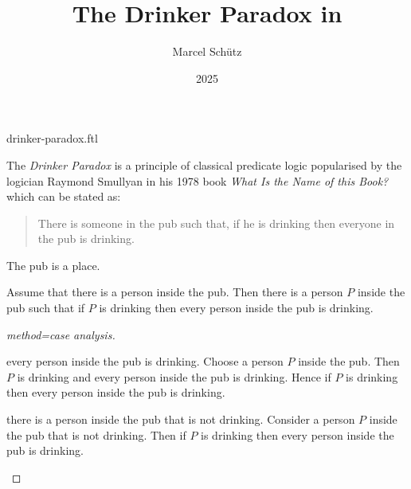 \documentclass{stex}
\title{The Drinker Paradox in \Naproche}
\author{Marcel Schütz}
\date{2025}
\begin{document}
\begin{smodule}{drinker-paradox.ftl}
\maketitle


\noindent The \emph{Drinker Paradox} is a principle of classical predicate 
logic popularised by the logician Raymond Smullyan in his 1978 book
\textit{What Is the Name of this Book?} \cite{Smullyan1978} which can be 
stated as:

\begin{quotation}
  \noindent There is someone in the pub such that, if he is drinking then 
  everyone in the pub is drinking.
\end{quotation}

\begin{forthel}

  \begin{signature*}
    The pub is a place.
  \end{signature*}
  
  \begin{theorem*}[title=Drinker Paradox,id=drinker_paradox]
    Assume that there is a person inside the pub.
    Then there is a person $P$ inside the pub such that if $P$ is drinking then every person inside the pub is drinking.
  \end{theorem*}
  \begin{proof}[method=case analysis]
    \begin{case}{every person inside the pub is drinking.}
      Choose a person $P$ inside the pub.
      Then $P$ is drinking and every person inside the pub is drinking.
      Hence if $P$ is drinking then every person inside the pub is drinking.
    \end{case}
  
    \begin{case}{there is a person inside the pub that is not drinking.}
      Consider a person $P$ inside the pub that is not drinking.
      Then if $P$ is drinking then every person inside the pub is drinking.
    \end{case}
  \end{proof}
\end{forthel}

\printbibliography
{}
\end{smodule}
\end{document}
